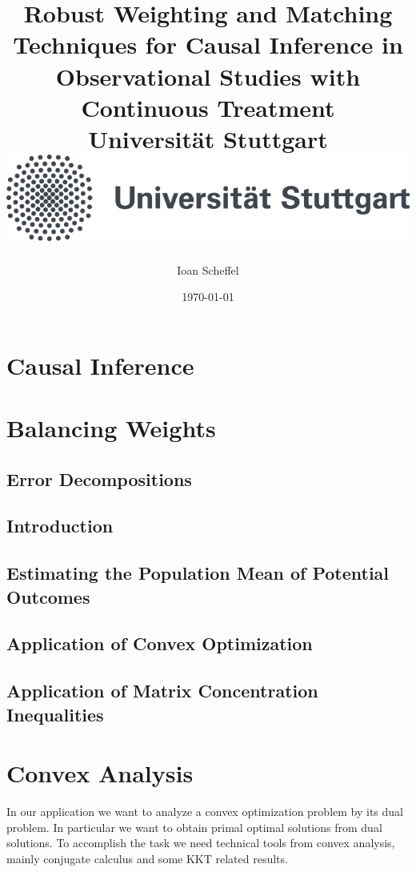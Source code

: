 \documentclass[12pt]{scrreport}
\title{
  {
    Robust Weighting and Matching Techniques for Causal Inference in Observational Studies with Continuous Treatment
  }
  \\
  {\large Universität Stuttgart}
  \\
  {\includegraphics{unistuttgart_logo_deutsch.jpg}}
}
\author{Ioan Scheffel}
\date{\today}
\theoremstyle{remark}
\theoremstyle{plain}
\begin{document}
\maketitle

\tableofcontents 

%

\chapter{Causal Inference}


\chapter{Balancing Weights}
  \section{Error Decompositions}
  
  \section{Introduction}
  \section{Estimating the Population Mean of Potential Outcomes}
  \section{Application of Convex Optimization}
  
  \section{Application of Matrix Concentration Inequalities}


\chapter{Convex Analysis}
In our application we want to analyze a convex optimization problem by its dual problem.
In particular we want to obtain primal optimal solutions from dual solutions.
To accomplish the task we need technical tools from convex analysis, 
mainly conjugate calculus and some KKT related results.
\end{document}
